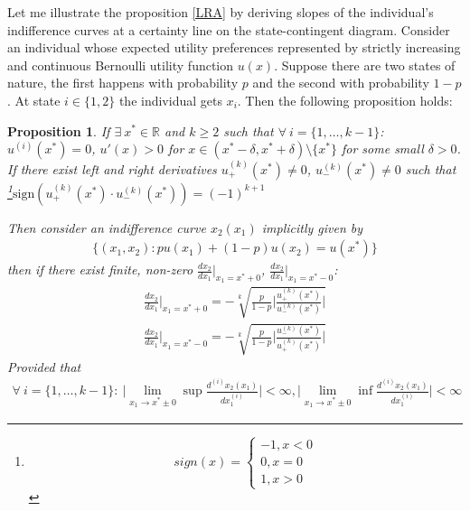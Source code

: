 \documentclass[a4paper]{article}
\newtheorem{proposition}[theorem]{Proposition}
\begin{document}
Let me illustrate the proposition \ref{LRA} by deriving slopes of the individual's indifference curves at a certainty line on the state-contingent diagram. 
Consider an individual whose expected utility preferences represented by strictly increasing and continuous Bernoulli utility function $u(x)$. Suppose there are two states of nature, the first happens with probability $p$ and the second with probability $1-p$. At state $i \in \{1, 2\}$ the individual gets $x_i$. Then the following proposition holds:
\begin{proposition}\label{slope}
	If $\exists\ x^* \in \mathbb{R}$ and $k \ge 2$ such that $\forall\ i = \{1, \dots, k-1  \}$: $u^{(i)}(x^*) = 0$, $u'(x) > 0$ for $x \in (x^*-\delta, x^*+\delta)\setminus \{x^*\}$ for some small $\delta>0$. If there exist left and right derivatives $u_{+}^{(k)}(x^*) \neq 0$, $u_{-}^{(k)}(x^*) \neq 0$ such that \footnote{$$sign(x) = \begin{cases}
			-1, x <0\\
			0, x=0\\
			1, x>0
		\end{cases}$$}$\text{sign}(u_{+}^{(k)}(x^*) \cdot u_{-}^{(k)}(x^*)) = (-1)^{k+1}$
	
	
	Then consider an indifference curve $x_2(x_1)$ implicitly given by 
	\begin{align}\label{ind}
		\{ (x_1, x_2): pu(x_1)+(1-p)u(x_2) = u(x^*) \}
	\end{align}
then if there exist finite, non-zero $\frac{d x_2}{d x_1} \bigg|_{x_1=x^*+0}$,  $\frac{d x_2}{d x_1} \bigg|_{x_1=x^*-0}$:
	\begin{align}
		\frac{d x_2}{d x_1} \bigg|_{x_1=x^*+0} = -\sqrt[k]{\frac{p}{1-p} \bigg|  \frac{u^{(k)}_{+}(x^*)}{u^{(k)}_{-}(x^*)} \bigg|  }\\
		\frac{d x_2}{d x_1} \bigg|_{x_1=x^*-0} = -\sqrt[k]{\frac{p}{1-p} \bigg|  \frac{u^{(k)}_{-}(x^*)}{u^{(k)}_{+}(x^*)} \bigg|  }
	\end{align}
Provided that 
\begin{align}\label{der}
\forall\ i = \{1, \dots, k-1\}:\ \bigg| \lim_{x_1 \to x^* \pm 0} \sup \frac{d^{(i)}x_2(x_1)}{dx_1^{(i)}}\bigg| < \infty, \bigg| \lim_{x_1 \to x^* \pm 0} \inf \frac{d^{(i)}x_2(x_1)}{dx_1^{(i)}}\bigg| < \infty
\end{align}
\end{proposition}
\end{document}
